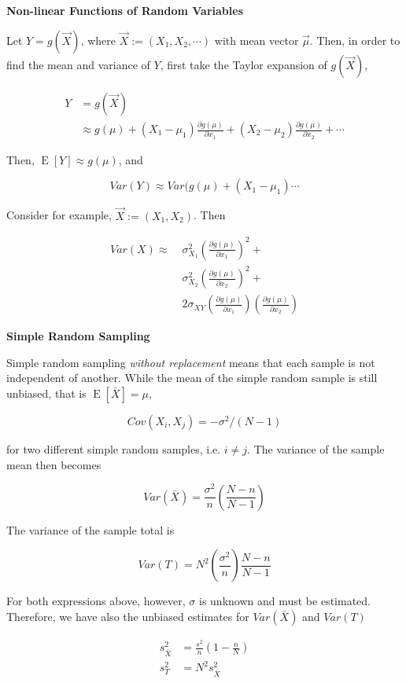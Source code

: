 \documentclass[a4paper]{article}
\newcommand{\subheading}[1]{{\scriptsize\textbf{#1}}}
\newcommand{\expectation}[1]{\operatorname{E}[#1]}
\begin{document}
\begin{multicols*}{4}
\subheading{Non-linear Functions of Random Variables}

Let $Y = g(\vec{X})$, where $\vec{X} := (X_1, X_2, \cdots)$ with mean vector
$\vec{\mu}$. Then, in order to find the mean and variance of $Y$, first take the
Taylor expansion of $g(\vec{X})$,

\begin{align*}
  Y &= g(\vec{X}) \\
    &\approx
      g(\mu) +
      (X_1 - \mu_1)\frac{\partial g(\mu)}{\partial x_1} +
      (X_2 - \mu_2)\frac{\partial g(\mu)}{\partial x_2} + \cdots
\end{align*}

Then, $\expectation{Y} \approx g(\mu)$, and 

$$Var(Y) \approx Var(g(\mu) + (X_1 - \mu_1)\cdots$$

Consider for example, $\vec{X} := (X_1, X_2)$. Then

\begin{align*}
Var(X) \approx\;
  &\sigma^2_{X_1} \left ( \frac{\partial g(\mu)}{\partial x_1} \right )^2 + \\
  &\sigma^2_{X_2} \left ( \frac{\partial g(\mu)}{\partial x_2} \right )^2 + \\
  &2\sigma_{XY} \left ( \frac{\partial g(\mu)}{\partial x_1} \right )
  \left ( \frac{\partial g(\mu)}{\partial x_2} \right )
\end{align*}

\subheading{Simple Random Sampling}

Simple random sampling \textit{without replacement} means that each sample is
not independent of another. While the mean of the simple random sample is still
unbiased, that is $\expectation{\bar{X}} = \mu$,

$$Cov(X_i, X_j) = -\sigma^2 / (N-1)$$

for two different simple random samples, i.e. $i \neq j$. The variance of the
sample mean then becomes

$$Var(\bar{X}) = \frac{\sigma^2}{n} \left ( \frac{N - n}{N - 1} \right )$$

The variance of the sample total is

$$Var(T) = N^2 \left ( \frac{\sigma^2}{n} \right ) \frac{N- n}{N-1}$$

For both expressions above, however, $\sigma$ is unknown and must be estimated.
Therefore, we have also the unbiased estimates for $Var(\bar{X})$ and $Var(T)$

\begin{align*}
  s^2_{\bar{X}} &= \frac{s^2}{n} \left ( 1 - \frac{n}{N} \right ) \\
  s^2_T &= N^2 s^2_{\bar{X}}
\end{align*}


\end{multicols*}
\end{document}
